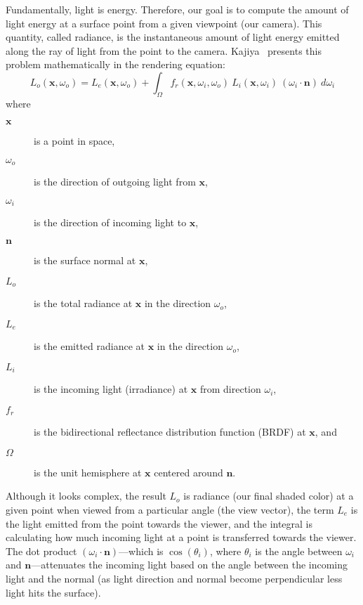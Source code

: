 Fundamentally, light is energy. Therefore, our goal is to compute the amount of light energy at a surface point from a given viewpoint (our camera). This quantity, called radiance, is the instantaneous amount of light energy emitted along the ray of light from the point to the camera. Kajiya~\cite{Kajiya:1986:RE:15886.15902} presents this problem mathematically in the rendering equation:
\begin{equation*}
    L_o(\bm{x}, \omega_o) = L_e(\bm{x}, \omega_o) + \int_\Omega f_r(\bm{x}, \omega_i, \omega_o)\ L_i(\bm{x}, \omega_i)\ (\omega_i \cdot \bm{n})\ d\omega_i
\end{equation*}
where
\begin{description}
    \item[$\bm{x}$] is a point in space,
    \item[$\omega_o$] is the direction of outgoing light from $\bm{x}$,
    \item[$\omega_i$] is the direction of incoming light to $\bm{x}$,
    \item[$\bm{n}$] is the surface normal at $\bm{x}$, 
    \item[$L_o$] is the total radiance at $\bm{x}$ in the direction $\omega_o$,
    \item[$L_e$] is the emitted radiance at $\bm{x}$ in the direction $\omega_o$,
    \item[$L_i$] is the incoming light (irradiance) at $\bm{x}$ from direction $\omega_i$,
    \item[$f_r$] is the bidirectional reflectance distribution function (BRDF) at $\bm{x}$, and
    \item[$\Omega$] is the unit hemisphere at $\bm{x}$ centered around $\bm{n}$.
\end{description}

Although it looks complex, the result $L_o$ is radiance (our final shaded color) at a given point when viewed from a particular angle (the view vector), the term $L_e$ is the light emitted from the point towards the viewer, and the integral is calculating how much incoming light at a point is transferred towards the viewer. The dot product $(\omega_i \cdot \bm{n})$---which is $\cos(\theta_i)$, where $\theta_i$ is the angle between $\omega_i$ and $\bm{n}$---attenuates the incoming light based on the angle between the incoming light and the normal (as light direction and normal become perpendicular less light hits the surface).


